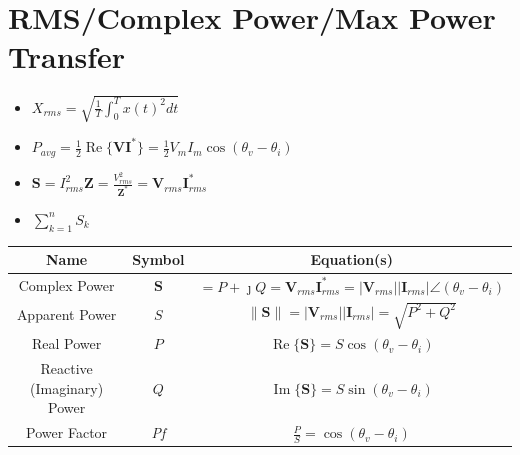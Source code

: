 \documentclass[10pt,letterpaper,final,twoside,notitlepage]{article}
\renewcommand{\Re}{\operatorname{Re}} %
\renewcommand{\Im}{\operatorname{Im}} %
\begin{document}
\section*{RMS/Complex Power/Max Power Transfer} \label{sec:Complex Power}
	\begin{itemize}[noitemsep]
		\item $X_{rms}=\sqrt{\frac{1}{T} \int_{0}^{T} x(t)^2 dt}$
		\item $P_{avg}=\frac{1}{2} \Re\lbrace \mathbf{V} \mathbf{I}^* \rbrace=\frac{1}{2}V_{m}I_{m}\cos \left(\theta_v -\theta_i \right)$
		\item $\mathbf{S} = I_{rms}^2\mathbf{Z} = \frac{V_{rms}^2}{\mathbf{Z}^*} = \mathbf{V}_{rms}\mathbf{I}_{rms}^*$
		\item $\sum_{k=1}^{n} S_{k}$
	\end{itemize}
	\begin{table}[h!] %
		\centering
		\renewcommand{\arraystretch}{1.4}
		\begin{tabular}{|c|c|c|}
			\hline
			\textbf{Name} & \textbf{Symbol} & \textbf{Equation(s)} \\ \hline
			Complex Power & $\mathbf{S}$ & $=P+\jmath Q=\mathbf{V}_{rms} \mathbf{I}_{rms}^{*} = \lvert \mathbf{V}_{rms}\rvert \lvert \mathbf{I}_{rms}\rvert \angle \left( \theta_v - \theta_i\right) $ \\ \hline
			Apparent Power & $S$ & $\lVert \mathbf{S} \rVert = \lvert \mathbf{V}_{rms} \rvert \lvert \mathbf{I}_{rms} \rvert = \sqrt{P^2 + Q^2}$ \\ \hline
			Real Power & $P$ & $\Re\lbrace \mathbf{S} \rbrace = S \cos\left( \theta_v - \theta_i \right)$ \\ \hline
			Reactive (Imaginary) Power & $Q$ & $\Im\lbrace \mathbf{S} \rbrace = S \sin \left( \theta_v - \theta_i \right)$ \\ \hline
			Power Factor &\textit{Pf} & $\frac{P}{S} = \cos(\theta_v - \theta_i)$ \\ \hline
		\end{tabular}
	\end{table}
\end{document}
